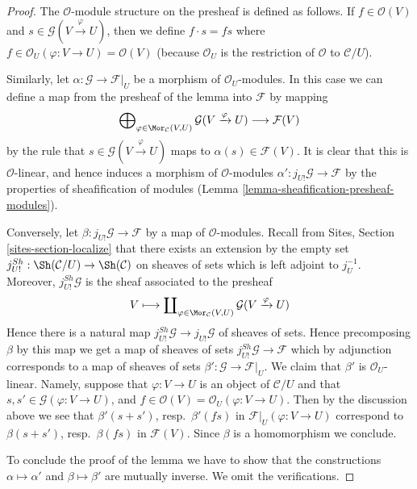 \begin{proof}
The $\mathcal{O}$-module structure on the presheaf is defined as
follows. If $f \in \mathcal{O}(V)$ and
$s \in \mathcal{G}(V \xrightarrow{\varphi} U)$, then
we define $f \cdot s = fs$ where
$f \in \mathcal{O}_U(\varphi : V \to U) = \mathcal{O}(V)$
(because $\mathcal{O}_U$ is the restriction of $\mathcal{O}$ to
$\mathcal{C}/U$).

\medskip\noindent
Similarly, let $\alpha : \mathcal{G} \to \mathcal{F}|_U$ be a
morphism of $\mathcal{O}_U$-modules. In this case we can define
a map from the presheaf of the lemma into $\mathcal{F}$ by mapping
$$
\bigoplus\nolimits_{\varphi \in \Mor_\mathcal{C}(V, U)}
\mathcal{G}(V \xrightarrow{\varphi} U)
\longrightarrow
\mathcal{F}(V)
$$
by the rule that $s \in \mathcal{G}(V \xrightarrow{\varphi} U)$
maps to $\alpha(s) \in \mathcal{F}(V)$. It is clear that this is
$\mathcal{O}$-linear, and hence induces a morphism of
$\mathcal{O}$-modules $\alpha' : j_{U!}\mathcal{G} \to \mathcal{F}$
by the properties of sheafification of modules
(Lemma \ref{lemma-sheafification-presheaf-modules}).

\medskip\noindent
Conversely, let $\beta : j_{U!}\mathcal{G} \to \mathcal{F}$
by a map of $\mathcal{O}$-modules.
Recall from Sites, Section \ref{sites-section-localize}
that there exists an extension by the empty set
$j^{Sh}_{U!} : \Sh(\mathcal{C}/U) \to \Sh(\mathcal{C})$
on sheaves of sets which is left adjoint to $j_U^{-1}$.
Moreover, $j^{Sh}_{U!}\mathcal{G}$ is the sheaf associated to the presheaf
$$
V
\longmapsto
\coprod\nolimits_{\varphi \in \Mor_\mathcal{C}(V, U)}
\mathcal{G}(V \xrightarrow{\varphi} U)
$$
Hence there is a natural map
$j^{Sh}_{U!}\mathcal{G} \to j_{U!}\mathcal{G}$ of sheaves of sets.
Hence precomposing $\beta$ by this map we get a map of sheaves of sets
$j^{Sh}_{U!}\mathcal{G} \to \mathcal{F}$ which by adjunction corresponds
to a map of sheaves of sets $\beta' : \mathcal{G} \to \mathcal{F}|_U$.
We claim that $\beta'$ is $\mathcal{O}_U$-linear. Namely, suppose
that $\varphi : V \to U$ is an object of $\mathcal{C}/U$ and that
$s, s' \in \mathcal{G}(\varphi : V \to U)$, and
$f \in \mathcal{O}(V) = \mathcal{O}_U(\varphi : V \to U)$.
Then by the discussion above we see that
$\beta'(s + s')$, resp.\  $\beta'(fs)$ in $\mathcal{F}|_U(\varphi : V \to U)$
correspond to $\beta(s + s')$, resp.\ $\beta(fs)$ in
$\mathcal{F}(V)$. Since $\beta$ is a homomorphism we conclude.

\medskip\noindent
To conclude the proof of the lemma we have to show that the constructions
$\alpha \mapsto \alpha'$ and $\beta \mapsto \beta'$ are mutually inverse.
We omit the verifications.
\end{proof}

